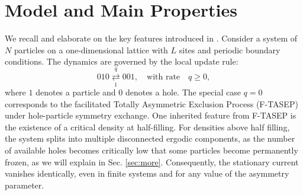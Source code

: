 \documentclass[pdflatex,sn-mathphys-num]{sn-jnl}
\theoremstyle{definition}
\theoremstyle{remark}
\numberwithin{equation}{section}
\begin{document}
\section{Model and Main Properties}
\label{sec1}
We recall and elaborate on the key features introduced in \cite{grosskinsky2025long}. Consider a system of \(N\) particles on a one-dimensional lattice with \(L\) sites and periodic boundary conditions. The dynamics are governed by the local update rule:
\begin{equation}
    010 \underset{1}{\stackrel{q}{\rightleftarrows}} 001,
    \quad
    \text{with rate} \quad q \geq 0,
\end{equation}
where \(1\) denotes a particle and \(0\) denotes a hole. The special case \(q = 0\) corresponds to the facilitated Totally Asymmetric Exclusion   Process (F-TASEP) under hole-particle symmetry exchange. One inherited feature from F-TASEP is the existence of a critical density at half-filling.
For densities above half filling, the system splits into multiple disconnected ergodic components, as the number of available holes becomes critically low that some particles become permanently frozen, as we will explain in Sec. \ref{sec:more}. Consequently, the stationary current vanishes identically, even in finite systems and for any value of the asymmetry parameter. 
\end{document}
